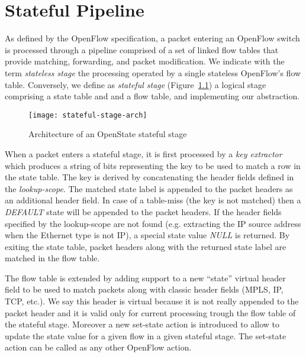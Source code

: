 
\chapter{Stateful Pipeline}

As defined by the OpenFlow specification, a packet entering an OpenFlow switch is processed through a pipeline comprised of a set of linked flow tables that provide matching, forwarding, and packet modification. We indicate with the term \emph{stateless stage} the processing operated by a single stateless OpenFlow's flow table. Conversely, we define as \emph{stateful stage} (Figure~\ref{f:stateful-stage}) a logical stage comprising a state table and and a flow table, and implementing our abstraction.

\begin{figure}[h]
	\centering
	\texttt{[image: stateful-stage-arch]}
	\caption{Architecture of an OpenState stateful stage}
	\label{f:stateful-stage}
\end{figure}

When a packet enters a stateful stage, it is first processed by a \emph{key extractor} which produces a string of bits representing the key to be used to match a row in the state table. The key is derived by concatenating the header fields defined in the \emph{lookup-scope}. The matched state label is appended to the packet headers as an additional header field. In case of a table-miss (the key is not matched) then a \emph{DEFAULT} state will be appended to the packet headers. If the header fields specified by the lookup-scope are not found (e.g. extracting the IP source address when the Ethernet type is not IP), a special state value \emph{NULL} is returned. By exiting the state table, packet headers along with the returned state label are matched in the flow table.

The flow table is extended by adding support to a new ``state'' virtual header field to be used to match packets along with classic header fields (MPLS, IP, TCP, etc.). We say this header is virtual because it is not really appended to the packet header and it is valid only for current processing trough the flow table of the stateful stage. Moreover a new set-state action is introduced to allow to update the state value for a given flow in a given stateful stage. The set-state action can be called as any other OpenFlow action.


